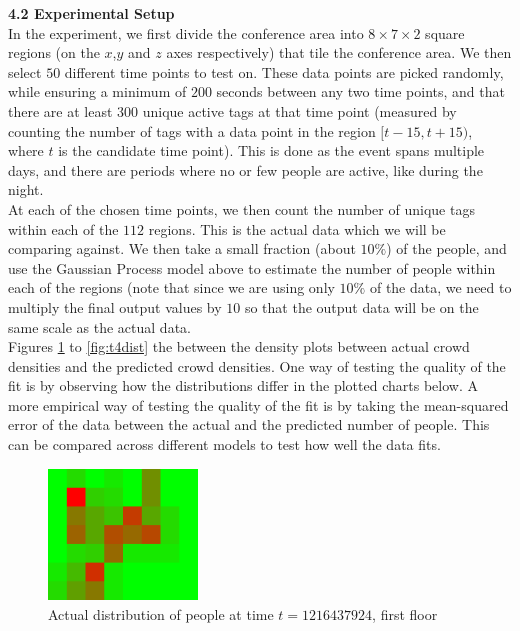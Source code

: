 \documentclass[letterpaper]{article}
\begin{document}
{\bf4.2  Experimental Setup} \\

In the experiment, we first divide the conference area into $8\times 7 \times 2$ square regions (on the $x$,$y$ and $z$ axes respectively) that tile the conference area. We then select $50$ different time points to test on. These data points are picked randomly, while ensuring a minimum of $200$ seconds between any two time points, and that there are at least $300$ unique active tags at that time point (measured by counting the number of tags with a data point in the region $[t-15,t+15)$, where $t$ is the candidate time point). This is done as the event spans multiple days, and there are periods where no or few people are active, like during the night.\\

At each of the chosen time points, we then count the number of unique tags within each of the $112$ regions. This is the actual data which we will be comparing against. We then take a small fraction (about $10\%$) of the people, and use the Gaussian Process model above to estimate the number of people within each of the regions (note that since we are using only $10\%$ of the data, we need to multiply the final output values by $10$ so that the output data will be on the same scale as the actual data. \\

Figures \ref{fig:t1dist} to \ref{fig:t4dist} the between the density plots between actual crowd densities and the predicted crowd densities. One way of testing the quality of the fit is by observing how the distributions differ in the plotted charts below. A more empirical way of testing the quality of the fit is by taking the mean-squared error of the data between the actual and the predicted number of people. This can be compared across different models to test how well the data fits. \\

\begin{figure}[h!]
  \centering
    \includegraphics[width=150px,natwidth=320,natheight=280]{selected_renders/0_1216437924.png}
  \caption{Actual distribution of people at time $t=1216437924$, first floor}
  \label{fig:t1dist}
\end{figure}
\end{document}
